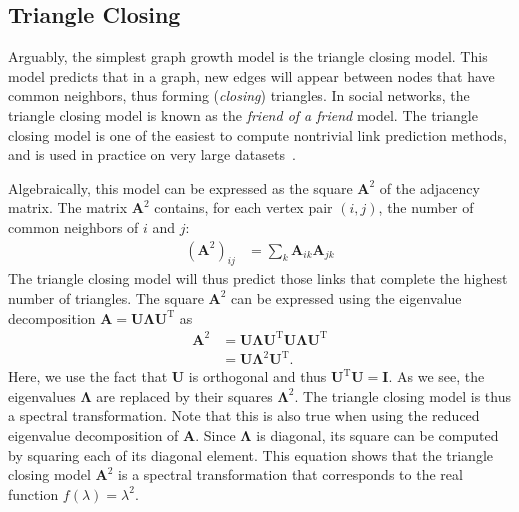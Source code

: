 \documentclass[11pt,a4paper]{book}
\begin{document}
\subsection{Triangle Closing}
\label{sec:triangle-closing}
Arguably, the simplest graph growth model is the triangle closing
model.  This model predicts that in a graph, new edges will appear
between nodes that have common neighbors, thus forming (\emph{closing})
triangles.  In social networks, the triangle closing model is known as
the \emph{friend of a friend} model.  The triangle closing model is one
of the easiest to compute nontrivial link prediction methods, 
and is used in practice on very large datasets~\cite{b461}. 

Algebraically, this model can be
expressed as the square $\mathbf A^2$ of the adjacency matrix.  The
matrix $\mathbf A^2$ contains, for each vertex pair $(i,j)$, the number
of common neighbors of $i$ and $j$:
\begin{align}
  (\mathbf A^2)_{ij} &= \sum_k \mathbf A_{ik} \mathbf A_{jk} 
  \label{eq:triangle-closing}
\end{align}
The triangle closing model will thus predict those links that
complete the highest number of triangles.  
The square $\mathbf A^2$ can be expressed using the eigenvalue
decomposition $\mathbf A = \mathbf U \mathbf \Lambda \mathbf U^{\mathrm
  T}$ as
\begin{align*}
  \mathbf A^2 &= \mathbf U \mathbf \Lambda \mathbf U^{\mathrm T} \mathbf U \mathbf
  \Lambda \mathbf U^{\mathrm T} \\
  &= \mathbf U \mathbf \Lambda^2 \mathbf U^{\mathrm T}.
\end{align*}
Here, we use the fact that $\mathbf U$ is orthogonal and thus $\mathbf
U^{\mathrm T} \mathbf U = \mathbf I$.  
As we see, the eigenvalues $\mathbf \Lambda$ are replaced by their
squares $\mathbf \Lambda^2$.  The triangle closing model is thus a
spectral transformation. 
Note that this is also true when using the reduced eigenvalue
decomposition of $\mathbf A$. 
Since $\mathbf \Lambda$ is diagonal, its square can be computed by squaring each
of its diagonal element. 
This equation shows that the triangle closing model $\mathbf A^2$ is a
spectral transformation that corresponds to the real function
$f(\lambda) = \lambda^2$. 
\end{document}
